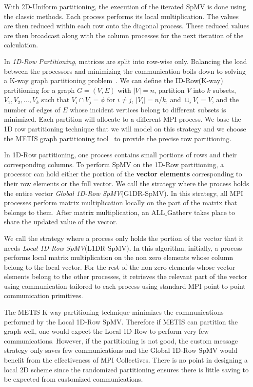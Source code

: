 \documentclass[conference, 10ppt]{IEEEtran}
\begin{document}
With 2D-Uniform partitioning, the execution of the iterated SpMV is
done using the classic methods. Each process performs its local
multiplication. The values are then reduced within each row onto the
diagonal process. These reduced values are then broadcast along with the
column processes for the next iteration of the calculation.

In \textit{1D-Row Partitioning}, matrices are split into row-wise
only. Balancing the load between the processors and minimizing the
communication boils down to solving a K-way graph partitioning
problem~\cite{kaya2013analysis}.  We can define the ID-Row(K-way)
partitioning for a graph $G=(V,E)$ with $|V|=n$, partition $V$ into
$k$ subsets, $V_1, V_2, \dots, V_k$ such that $V_i \cap V_j=\phi$ for
$i\neq j$, $|V_i| = n/k$, and $\cup_i V_i = V$, and the number of
edges of $E$ whose incident vertices belong to different subsets is
minimized. Each partition will allocate to a different MPI
process. We base the 1D row partitioning technique that we will model
on this strategy and we choose the METIS graph partitioning
tool~\cite{karypis1995multilevel} to provide the precise row
partitioning.

In 1D-Row partitioning, one process contains small portions of rows
and their corresponding columns. To perform SpMV on the 1D-Row
partitioning, a processor can hold either the portion of the \textbf{vector
  elements} corresponding to their row elements or the full vector.
We call the strategy where the process holds the entire vector \textit{Global
  1D-Row SpMV}(G1DR-SpMV). In this strategy, all MPI processes
perform matrix multiplication locally on the part of the matrix that
belongs to them. After matrix multiplication, an ALL$\_$Gatherv takes
place to share the updated value of the vector.

We call the strategy where a process only holds the portion of the
vector that it needs \textit{Local 1D-Row SpMV}(L1DR-SpMV).  In this
algorithm, initially, a process performs local matrix multiplication
on the non zero elements whose column belong to the local vector.  For
the rest of the non zero elements whose vector elements belong to the
other processes, it retrieves the relevant part of the vector using
communication tailored to each process using standard MPI point to
point communication primitives.

The METIS K-way partitioning technique minimizes the communications
performed by the Local 1D-Row SpMV. Therefore if METIS can partition
the graph well, one would expect the Local 1D-Row to perform very few
communications. However, if the partitioning is not good, the custom
message strategy only saves few communications and the Global 1D-Row
SpMV would benefit from the effectiveness of MPI Collectives. There is
no point in designing a local 2D scheme since the randomized
partitioning ensures there is little saving to be expected from
customized communications.
\end{document}

